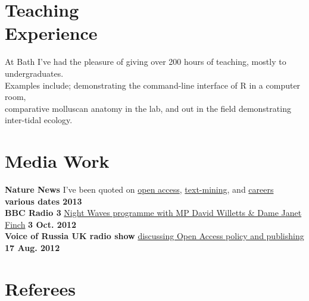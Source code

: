 \documentclass[margin,line]{resume}
\begin{document}
\begin{resume}
    \section{\mysidestyle Teaching \\ Experience}

At Bath I've had the pleasure of giving over 200 hours of teaching, mostly to undergraduates. \\ Examples include; demonstrating the command-line interface of R in a computer room, \\ comparative molluscan anatomy in the lab, and out in the field demonstrating inter-tidal ecology.\\

\vspace{-7 mm} 
    \section{\mysidestyle Media Work}
\textbf{Nature News} I've been quoted on \href{http://dx.doi.org/10.1038/nature.2013.12384}{open access}, \href{http://dx.doi.org/10.1038/495295a}{text-mining}, and \href{http://dx.doi.org/10.1038/nj7442-539a}{careers} \hfill \textbf{various dates 2013}\\
\textbf{BBC Radio 3} \href{http://www.bbc.co.uk/iplayer/episode/b01n1rth/Night_Waves_Open_Accesss_Anne_Applebaum_Berenice/}{Night Waves programme with MP David Willetts \& Dame Janet Finch} \hfill \textbf{3 Oct. 2012}\\
\textbf{Voice of Russia UK radio show} \href{http://ruvr.co.uk/2012_08_17/85416708/}{discussing Open Access policy and publishing} \hfill \textbf{17 Aug. 2012}\\


\vspace{-7 mm} 
 



\section{\mysidestyle Referees} 


\end{resume}
\end{document}
